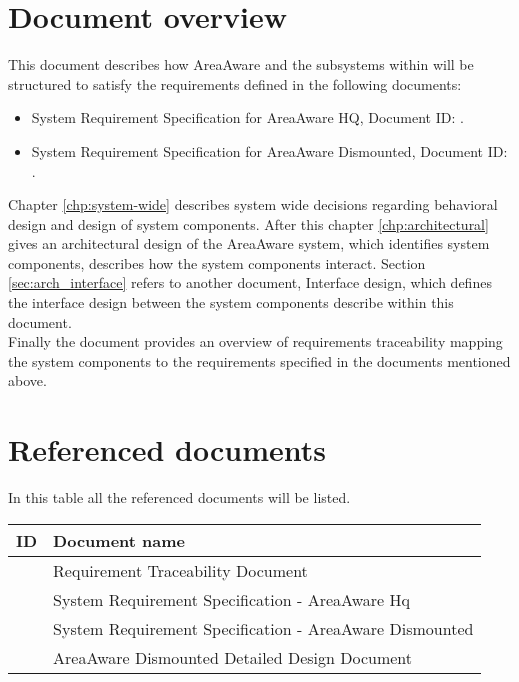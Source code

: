 \section{Document overview}
This document describes how AreaAware and the subsystems within will be structured to satisfy the requirements defined in the following documents:
\begin{itemize}
    \item System Requirement Specification for AreaAware HQ, Document ID: \srshq.
    \item System Requirement Specification for AreaAware Dismounted, Document ID: \srsdis.
\end{itemize}

Chapter \ref{chp:system-wide} describes system wide decisions regarding behavioral design and design of system components.
After this chapter \ref{chp:architectural} gives an architectural design of the AreaAware system, which identifies system components, describes how the system components interact.
Section \ref{sec:arch_interface} refers to another document, Interface design, which defines the interface design between the system components describe within this document. \\
Finally the document provides an overview of requirements traceability mapping the system components to the requirements specified in the documents mentioned above.

\section{Referenced documents}
In this table all the referenced documents will be listed.

\begin{tabular}{b{6cm} b{7cm}}
	\textbf{ID} & \textbf{Document name} \\
	\hline
	\rtm & Requirement Traceability Document \\
	\srshq & System Requirement Specification - AreaAware Hq \\
	\srsdis & System Requirement Specification - AreaAware Dismounted \\
	\aadisddd & AreaAware Dismounted Detailed Design Document\\
\end{tabular}